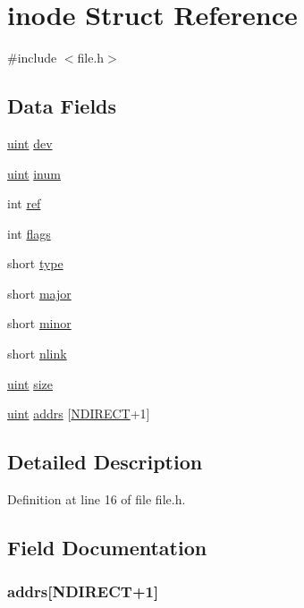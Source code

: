 \hypertarget{structinode}{\section{inode Struct Reference}
\label{structinode}
}


{\ttfamily \#include $<$file.\-h$>$}

\subsection*{Data Fields}
\begin{DoxyCompactItemize}
\item 
\hyperlink{types_8h_a91ad9478d81a7aaf2593e8d9c3d06a14}{uint} \hyperlink{structinode_aaf61a1db4c34c23857104abc633d8ee6}{dev}
\item 
\hyperlink{types_8h_a91ad9478d81a7aaf2593e8d9c3d06a14}{uint} \hyperlink{structinode_a28fdf3543c2464efb0ec94a429ef8acc}{inum}
\item 
int \hyperlink{structinode_adb528a1cb1ca190150183394d082590d}{ref}
\item 
int \hyperlink{structinode_ac8bf36fe0577cba66bccda3a6f7e80a4}{flags}
\item 
short \hyperlink{structinode_acd579dfd50a9ea905ca697ed8707bf3b}{type}
\item 
short \hyperlink{structinode_abe2b53edb36f3d674f052ab7254d4a3e}{major}
\item 
short \hyperlink{structinode_adb75a8841fbdda3cb4f2373edac4f1dc}{minor}
\item 
short \hyperlink{structinode_aa7e1ed70907ed9a2fc9c9a7c24cd0d4d}{nlink}
\item 
\hyperlink{types_8h_a91ad9478d81a7aaf2593e8d9c3d06a14}{uint} \hyperlink{structinode_a22d26304a3b3aca97e6311f6939dd1bf}{size}
\item 
\hyperlink{types_8h_a91ad9478d81a7aaf2593e8d9c3d06a14}{uint} \hyperlink{structinode_a94905615a8f79fd11b8f500e1bbee16d}{addrs} \mbox{[}\hyperlink{fs_8h_acd38e9532d4b3623f844b93c012a8e06}{N\-D\-I\-R\-E\-C\-T}+1\mbox{]}
\end{DoxyCompactItemize}


\subsection{Detailed Description}


Definition at line 16 of file file.\-h.



\subsection{Field Documentation}
\hypertarget{structinode_a94905615a8f79fd11b8f500e1bbee16d}{
\subsubsection[{addrs}]{ addrs\mbox{[}{\bf N\-D\-I\-R\-E\-C\-T}+1\mbox{]}}}\label{structinode_a94905615a8f79fd11b8f500e1bbee16d}


